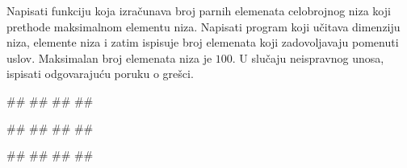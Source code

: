 \begin{Exercise}[label=p.broj_manjih_od_maksimuma] 
 Napisati funkciju koja izračunava broj parnih elemenata celobrojnog niza
 koji prethode maksimalnom elementu niza.
 Napisati program koji učitava dimenziju niza, elemente niza i zatim ispisuje broj
 elemenata koji zadovoljavaju pomenuti uslov.
 Maksimalan broj elemenata niza je $100$.
U slučaju neispravnog unosa, ispisati odgovarajuću poruku o grešci. 

\begin{miditest}
\begin{upotreba}{1}
#\naslovInt#
##
##
##
\end{upotreba}
\end{miditest}
\begin{miditest}
\begin{upotreba}{2}
#\naslovInt#
##
##
##
\end{upotreba}
\end{miditest}

\begin{miditest}
\begin{upotreba}{3}
#\naslovInt#
##
##
##
\end{upotreba}
\end{miditest}

\end{Exercise}

\ifresenja
\begin{Answer}[ref=p.broj_manjih_od_maksimuma]
\end{Answer}
\fi


